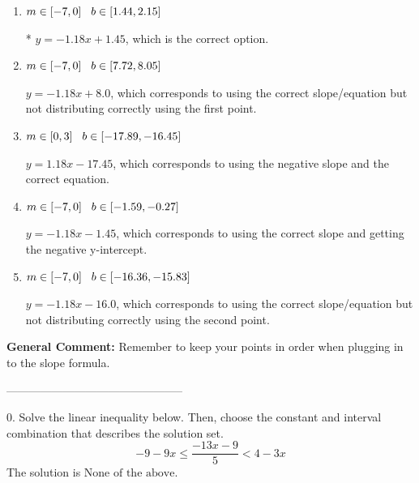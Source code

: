 \documentclass{extbook}[14pt]
\begin{document}
\begin{enumerate}[label=\Alph*.] 
\item $ m \in [-7, 0] \hspace*{3mm} b \in [1.44, 2.15] $ 

 * $y = -1.18x + 1.45$, which is the correct option. 
\item $ m \in [-7, 0] \hspace*{3mm} b \in [7.72, 8.05] $ 

  $y = -1.18x + 8.0$, which corresponds to using the correct slope/equation but not distributing correctly using the first point. 
\item $ m \in [0, 3] \hspace*{3mm} b \in [-17.89, -16.45] $ 

  $y = 1.18x -17.45$, which corresponds to using the negative slope and the correct equation. 
\item $ m \in [-7, 0] \hspace*{3mm} b \in [-1.59, -0.27] $ 

  $y = -1.18x -1.45$, which corresponds to using the correct slope and getting the negative y-intercept. 
\item $ m \in [-7, 0] \hspace*{3mm} b \in [-16.36, -15.83] $ 

  $y = -1.18x -16.0$, which corresponds to using the correct slope/equation but not distributing correctly using the second point. 
\end{enumerate} 
 
\textbf{General Comment:} Remember to keep your points in order when plugging in to the slope formula. 

-----------------------------------------------

0. Solve the linear inequality below. Then, choose the constant and interval combination that describes the solution set.
\[ -9 - 9 x \leq \frac{-13 x - 9}{5} < 4 - 3 x \] 
The solution is $ \text{None of the above.} $ 
\end{document}
